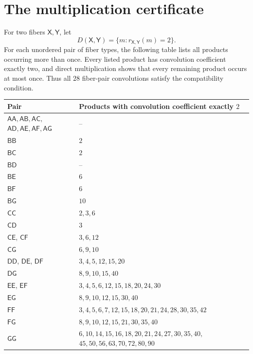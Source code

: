 \documentclass[11pt,reqno]{article}
\theoremstyle{definition}
\begin{document}
\section{The multiplication certificate}\label{app:certificate}

For two fibers \(\mathsf X,\mathsf Y\), let
\[
  D(\mathsf X,\mathsf Y)
  =\{m:r_{\mathsf X,\mathsf Y}(m)=2\}.
\]
For each unordered pair of fiber types, the following table lists all
products occurring more than once.  Every listed product has convolution
coefficient exactly two, and direct multiplication shows that every
remaining product occurs at most once.  Thus all \(28\) fiber-pair
convolutions satisfy the compatibility condition.

\begingroup
\small
\renewcommand{\arraystretch}{1.12}
\noindent
\begin{tabularx}{\textwidth}{
  >{\raggedright\arraybackslash}p{}
  >{\raggedright\arraybackslash}X}
\toprule
Pair & Products with convolution coefficient exactly \(2\)\\
\midrule
\(\mathsf{AA},\mathsf{AB},\mathsf{AC},\)\newline
\(\mathsf{AD},\mathsf{AE},\mathsf{AF},\mathsf{AG}\) & --\\
\(\mathsf{BB}\) & \(2\)\\
\(\mathsf{BC}\) & \(2\)\\
\(\mathsf{BD}\) & --\\
\(\mathsf{BE}\) & \(6\)\\
\(\mathsf{BF}\) & \(6\)\\
\(\mathsf{BG}\) & \(10\)\\
\(\mathsf{CC}\) & \(2,3,6\)\\
\(\mathsf{CD}\) & \(3\)\\
\(\mathsf{CE}\), \(\mathsf{CF}\) & \(3,6,12\)\\
\(\mathsf{CG}\) & \(6,9,10\)\\
\(\mathsf{DD}\), \(\mathsf{DE}\), \(\mathsf{DF}\)
  & \(3,4,5,12,15,20\)\\
\(\mathsf{DG}\) & \(8,9,10,15,40\)\\
\(\mathsf{EE}\), \(\mathsf{EF}\)
  & \(3,4,5,6,12,15,18,20,24,30\)\\
\(\mathsf{EG}\) & \(8,9,10,12,15,30,40\)\\
\(\mathsf{FF}\)
  & \(3,4,5,6,7,12,15,18,20,21,24,28,30,35,42\)\\
\(\mathsf{FG}\)
  & \(8,9,10,12,15,21,30,35,40\)\\
\(\mathsf{GG}\)
  & \(6,10,14,15,16,18,20,21,24,27,30,35,40,\)\newline
    \(45,50,56,63,70,72,80,90\)\\
\bottomrule
\end{tabularx}
\endgroup

\providecommand{\bysame}{Paul Erd\H{o}s}
\begingroup
\footnotesize


\endgroup
\end{document}
